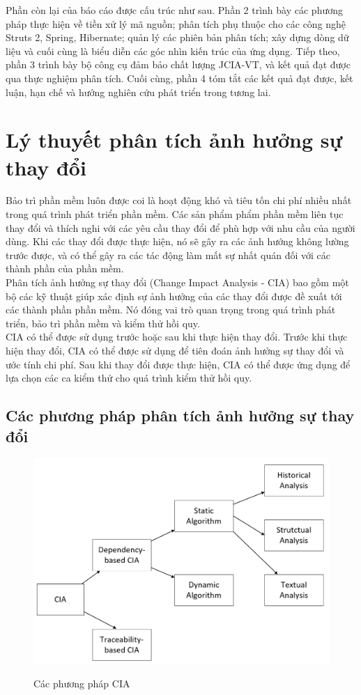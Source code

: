 \documentclass[12pt]{report}
\begin{document}
Phần còn lại của báo cáo được cấu trúc như sau. Phần 2 trình bày các phương pháp
thực hiện về tiền xử lý mã nguồn; phân tích phụ thuộc cho các công nghệ Struts 2, Spring,
Hibernate; quản lý các phiên bản phân tích; xây dựng dòng dữ liệu và cuối cùng là biểu
diễn các góc nhìn kiến trúc của ứng dụng. Tiếp theo, phần 3 trình bày bộ công cụ đảm
bảo chất lượng JCIA-VT, và kết quả đạt được qua thực nghiệm phân tích. Cuối cùng,
phần 4 tóm tắt các kết quả đạt được, kết luận, hạn chế và hướng nghiên cứu phát triển
trong tương lai.


\newpage	
\chapter{Lý thuyết phân tích ảnh hưởng sự thay đổi}
Bảo trì phần mềm luôn được coi là hoạt động khó và tiêu tốn chi phí nhiều nhất trong quá trình phát triển phần mềm. Các sản phẩm phẩm phần mềm liên tục thay đổi và thích nghi với các yêu cầu thay đổi để phù hợp với nhu cầu của người dùng. Khi các thay đổi được thực hiện, nó sẽ gây ra các ảnh hướng không lường trước được, và có thể gây ra các tác động làm mất sự nhất quán đối với các thành phần của phần mềm.\\

Phân tích ảnh hưởng sự thay đổi (Change Impact Analysis - CIA) bao gồm một bộ các kỹ thuật giúp xác định sự ảnh hưởng của các thay đổi được đề xuất tới các thành phần phần mềm. Nó đóng vai trò quan trọng trong quá trình phát triển, bảo trì phần mềm và kiểm thử hồi quy.\\

CIA có thể được sử dụng trước hoặc sau khi thực hiện thay đổi. Trước khi thực hiện thay đổi, CIA có thể được sử dụng để tiên đoán ảnh hưởng sự thay đổi và ước tính chi phí. Sau khi thay đổi được thực hiện, CIA có thể được ứng dụng để lựa chọn các ca kiểm thử cho quá trình kiểm thử hồi quy.\\

\section{Các phương pháp phân tích ảnh hưởng sự thay đổi}
\begin{figure}[h]
	\centering
	\includegraphics[scale=0.5]{CIA-hierarchy}
	\label{fig:cia-hierarchy}
	\caption{Các phương pháp CIA}
\end{figure}
\end{document}
